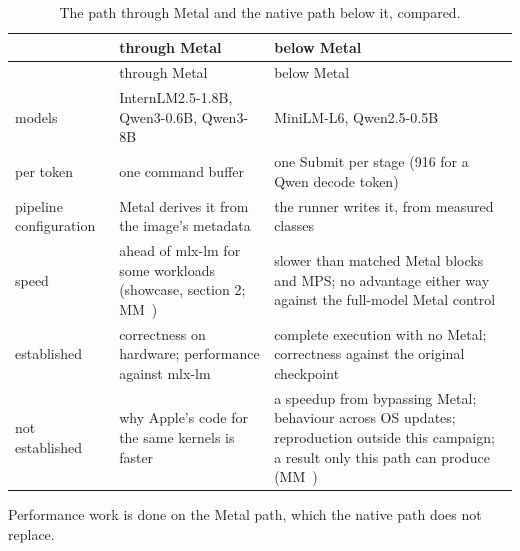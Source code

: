 \begin{xltabular}{\linewidth}{@{}>{\hsize}XX>{\hsize}X@{}}
\caption{The path through Metal and the native path below it, compared.}\label{tab:paths-compared}\\
\toprule
& through Metal & below Metal \\
\midrule
\endfirsthead
{}
\toprule
& through Metal & below Metal \\
\midrule
\endhead
models & InternLM2.5-1.8B, Qwen3-0.6B, Qwen3-8B & MiniLM-L6, Qwen2.5-0.5B \\*
per token & one command buffer & one Submit per stage (916 for a Qwen decode token) \\*
pipeline configuration & Metal derives it from the image's metadata & the runner writes it, from measured classes \\*
speed & ahead of mlx-lm for some workloads (showcase, section 2; MM~) & slower than matched Metal blocks and MPS; no advantage either way
against the full-model Metal control \\*
established & correctness on hardware; performance against mlx-lm & complete execution with no Metal; correctness against the original
checkpoint \\*
not established & why Apple's code for the same kernels is faster & a speedup from bypassing Metal; behaviour across OS updates;
reproduction outside this campaign; a result only this path can produce
(MM~) \\*
\bottomrule
\end{xltabular}

Performance work is done on the Metal path, which the native path does not replace.
